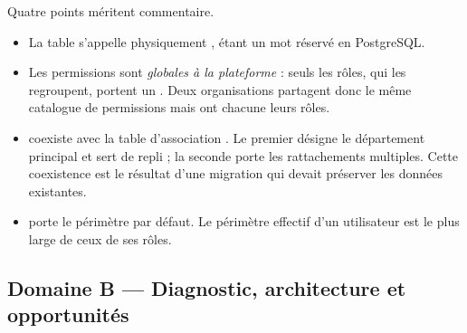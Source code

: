 Quatre points méritent commentaire.

\begin{itemize}
  \item La table  s'appelle physiquement ,  étant
    un mot réservé en PostgreSQL.
  \item Les permissions sont \emph{globales à la plateforme} : seuls les rôles, qui les
    regroupent, portent un . Deux organisations partagent donc le
    même catalogue de permissions mais ont chacune leurs rôles.
  \item {} coexiste avec la table d'association
    . Le premier désigne le département principal et sert de
    repli ; la seconde porte les rattachements multiples. Cette coexistence est le
    résultat d'une migration qui devait préserver les données existantes.
  \item {} porte le périmètre par défaut. Le périmètre effectif
    d'un utilisateur est le plus large de ceux de ses rôles.
\end{itemize}

\subsection{Domaine B — Diagnostic, architecture et opportunités}

